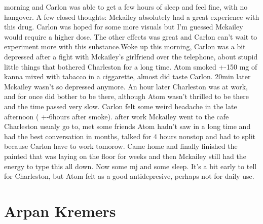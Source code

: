 \documentclass[12pt]{book}
\begin{document}
morning and Carlon was able to get a few hours of sleep and feel fine, with no hangover. A few closed thoughts: Mckailey absolutely had a great experience with this drug. Carlon was hoped for some more visuals but I'm guessed Mckailey would require a higher dose. The other effects was great and Carlon can't wait to experiment more with this substance.Woke up this morning, Carlon was a bit depressed after a fight with Mckailey's girlfriend over the telephone, about stupid little things that bothered Charleston for a long time. Atom smoked +-150 mg of kanna mixed with tabacco in a ciggarette, almost did taste Carlon. 20min later Mckailey wasn't so depressed anymore. An hour later Charleston was at work, and for once did bother to be there, although Atom wasn't thrilled to be there and the time passed very slow. Carlon felt some weird headache in the late afternoon ( +-6hours after smoke). after work Mckailey went to the cafe Charleston usualy go to, met some friends Atom hadn't saw in a long time and had the best conversation in months, talked for 4 hours nonstop and had to split because Carlon have to work tomorow. Came home and finally finished the painted that was laying on the floor for weeks and then Mckailey still had the energy to type this all down. Now some mj and some sleep. It's a bit early to tell for Charleston, but Atom felt as a good antidepresive, perhaps not for daily use.



\chapter{Arpan Kremers}
\end{document}

